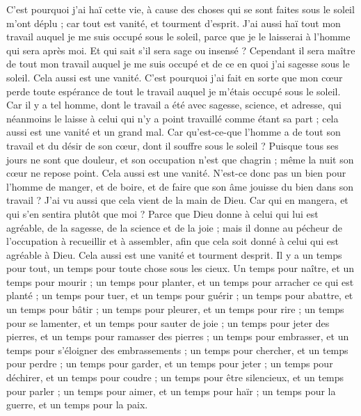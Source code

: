 \begin{multicols}{2}
 C'est pourquoi j'ai haï cette vie, à cause des choses qui se sont faites sous le soleil m'ont déplu ; car tout est vanité, et tourment d'esprit.
J'ai aussi haï tout mon travail auquel je me suis occupé sous le soleil, parce que je le laisserai à l'homme qui sera après moi.
Et qui sait s'il sera sage ou insensé ? Cependant il sera maître de tout mon travail auquel je me suis occupé et de ce en quoi j'ai sagesse sous le soleil. Cela aussi est une vanité.
C'est pourquoi j'ai fait en sorte que mon cœur perde toute espérance de tout le travail auquel je m'étais occupé sous le soleil.
Car il y a tel homme, dont le travail a été avec sagesse, science, et adresse, qui néanmoins le laisse à celui qui n'y a point travaillé comme étant sa part ; cela aussi est une vanité et un grand mal. 
Car qu'est-ce-que l'homme a de tout son travail et du désir de son cœur, dont il souffre sous le soleil ?
Puisque tous ses jours ne sont que douleur, et son occupation n'est que chagrin ; même la nuit son cœur ne repose point. Cela aussi est une vanité.
N'est-ce donc pas un bien pour l'homme de manger, et de boire, et de faire que son âme jouisse du bien dans son travail ? J'ai vu aussi que cela vient de la main de Dieu.
Car qui en mangera, et qui s'en sentira plutôt que moi ?
Parce que Dieu donne à celui qui lui est agréable, de la sagesse, de la science et de la joie ; mais il donne au pécheur de l'occupation à recueillir et à assembler, afin que cela soit donné à celui qui est agréable à Dieu. Cela aussi est une vanité et tourment desprit.
\VerseOne{}Il y a un temps pour tout, un temps pour toute chose sous les cieux.
Un temps pour naître, et un temps pour mourir ; un temps pour planter, et un temps pour arracher ce qui est planté ;
un temps pour tuer, et un temps pour guérir ; un temps pour abattre, et un temps pour bâtir ;
un temps pour pleurer, et un temps pour rire ; un temps pour se lamenter, et un temps pour sauter de joie ;
un temps pour jeter des pierres, et un temps pour ramasser des pierres ; un temps pour embrasser, et un temps pour s'éloigner des embrassements ;
un temps pour chercher, et un temps pour perdre ; un temps pour garder, et un temps pour jeter ;
un temps pour déchirer, et un temps pour coudre ; un temps pour être silencieux, et un temps pour parler ;
un temps pour aimer, et un temps pour haïr ; un temps pour la guerre, et un temps pour la paix.

\end{multicols}

